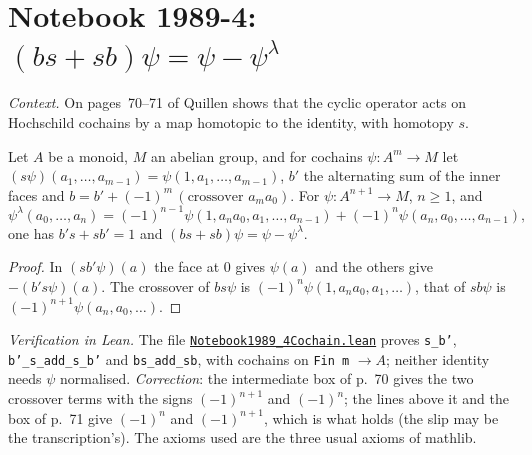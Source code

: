 \section[Notebook 1989-4: the cyclic operator is homotopic to 1]{Notebook 1989-4: $(bs + sb)\psi = \psi - \psi^\lambda$\protect{}}\label{sec:quillen-1989-4-cochain}

\emph{Context.} On pages~70--71 of  Quillen shows that the cyclic operator acts on Hochschild cochains by a map homotopic to the identity, with homotopy $s$.

\begin{encadre}
\begin{theoreme}\label{thm:quillen-1989-4-cochain}
Let $A$ be a monoid, $M$ an abelian group, and for cochains $\psi : A^{m} \to M$ let $(s\psi)(a_1, \dots, a_{m-1}) = \psi(1, a_1, \dots, a_{m-1})$, $b'$ the alternating sum of the inner faces and $b = b' + (-1)^m\,(\text{crossover } a_ma_0)$. For $\psi : A^{n+1} \to M$, $n \ge 1$, and
\[
\psi^\lambda(a_0, \dots, a_n) = (-1)^{n-1}\psi(1, a_na_0, a_1, \dots, a_{n-1}) + (-1)^n\psi(a_n, a_0, \dots, a_{n-1}),
\]
one has $b's + sb' = 1$ and $(bs + sb)\psi = \psi - \psi^\lambda$.
\end{theoreme}
\end{encadre}

\begin{proof}
In $(sb'\psi)(a)$ the face at $0$ gives $\psi(a)$ and the others give $-(b's\psi)(a)$. The crossover of $bs\psi$ is $(-1)^n\psi(1, a_na_0, a_1, \dots)$, that of $sb\psi$ is $(-1)^{n+1}\psi(a_n, a_0, \dots)$.
\end{proof}

\emph{Verification in Lean.} The file \href{\leanblobmain/Notebook1989_4Cochain.lean}{\texttt{Notebook1989\_4Cochain.\allowbreak{}lean}} proves \texttt{s\_b'}, \texttt{b'\_s\_add\_s\_b'} and \texttt{bs\_add\_sb}, with cochains on \texttt{Fin m} $\to A$; neither identity needs $\psi$ normalised. \emph{Correction}: the intermediate box of p.~70 gives the two crossover terms with the signs $(-1)^{n+1}$ and $(-1)^n$; the lines above it and the box of p.~71 give $(-1)^n$ and $(-1)^{n+1}$, which is what holds (the slip may be the transcription's). The axioms used are the three usual axioms of mathlib.

